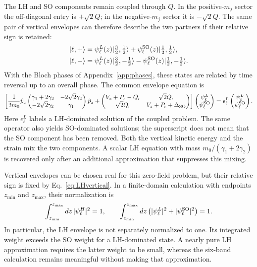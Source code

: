 The LH and SO components remain coupled through $Q$. In the positive-$m_j$ sector the off-diagonal entry is $+\sqrt2Q$; in the negative-$m_j$ sector it is $-\sqrt2Q$. The same pair of vertical envelopes can therefore describe the two partners if their relative sign is retained:
\begin{align}
\lvert \ell,+\rangle&=\psi_\ell^L(z)\lvert \tfrac32,\tfrac12\rangle
+\psi_\ell^{\mathrm{SO}}(z)\lvert \tfrac12,\tfrac12\rangle,\nonumber\\
\lvert \ell,-\rangle&=\psi_\ell^L(z)\lvert \tfrac32,-\tfrac12\rangle
-\psi_\ell^{\mathrm{SO}}(z)\lvert \tfrac12,-\tfrac12\rangle.
\label{eq:mixedpartners}
\end{align}
With the Bloch phases of Appendix~\ref{app:phases}, these states are related by time reversal up to an overall phase. The common envelope equation is
\begin{equation}
\left[
\frac{1}{2m_0} \hat{p}_ z
\begin{pmatrix}
\gamma_1+2\gamma_2&-2\sqrt2\gamma_2\\
-2\sqrt2\gamma_2&\gamma_1
\end{pmatrix} \hat{p}_ z
+
\begin{pmatrix}
V_z+P_\epsilon-Q_\epsilon&\sqrt2Q_\epsilon\\
\sqrt2Q_\epsilon&V_z+P_\epsilon+\Delta_{\mathrm{SO}}
\end{pmatrix}
\right]
\begin{pmatrix}\psi_\ell^L\\\psi_\ell^{\mathrm{SO}}\end{pmatrix}
=\epsilon_\ell^L
\begin{pmatrix}\psi_\ell^L\\\psi_\ell^{\mathrm{SO}}\end{pmatrix}.
\label{eq:LHvertical}
\end{equation}
Here $\epsilon_\ell^L$ labels a LH-dominated solution of the coupled problem. The same operator also yields SO-dominated solutions; the superscript does not mean that the SO component has been removed. Both the vertical kinetic energy and the strain mix the two components. A scalar LH equation with mass $m_0/(\gamma_1+2\gamma_2)$ is recovered only after an additional approximation that suppresses this mixing.

Vertical envelopes can be chosen real for this zero-field problem, but their relative sign is fixed by Eq.~\eqref{eq:LHvertical}. In a finite-domain calculation with endpoints $z_{\min}$ and $z_{\max}$, their normalization is
\begin{equation}
\int_{z_{\min}}^{z_{\max}}dz\,|\psi_\ell^H|^2=1,
\qquad
\int_{z_{\min}}^{z_{\max}}dz\,
\bigl(|\psi_\ell^L|^2+|\psi_\ell^{\mathrm{SO}}|^2\bigr)=1.
\label{eq:normalization}
\end{equation}
In particular, the LH envelope is not separately normalized to one. Its integrated weight exceeds the SO weight for a LH-dominated state. A nearly pure LH approximation requires the latter weight to be small, whereas the six-band calculation remains meaningful without making that approximation.

